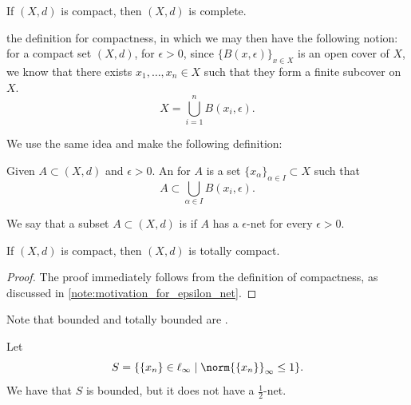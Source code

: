\documentclass[notoc,notitlepage]{tufte-book}
\begin{document}
\begin{crly}\label{crly:compact_metric_spaces_are_complete}
  If $(X, d)$ is compact, then $(X, d)$ is complete.
\end{crly}

\begin{note}\label{note:motivation_for_epsilon_net}
   the definition for compactness, in which we may then have the following notion: for a compact set $(X, d)$, for $\epsilon > 0$, since $\{ B(x, \epsilon ) \}_{x \in X}$ is an open cover of $X$, we know that there exists $x_1, \ldots, x_n \in X$ such that they form a finite subcover on $X$.
  \begin{equation*}
    X = \bigcup_{i=1}^{n} B(x_i, \epsilon).
  \end{equation*}
\end{note}

We use the same idea and make the following definition:

\begin{defn}\label{defn:_epsilon_net}
  Given $A \subset (X, d)$ and $\epsilon > 0$. An  for $A$ is a set $\{ x_\alpha \}_{\alpha \in I} \subset X$ such that
  \begin{equation*}
    A \subset \bigcup_{\alpha \in I} B(x_i, \epsilon).
  \end{equation*}
\end{defn}

\begin{defn}\label{defn:totally_bounded}
  We say that a subset $A \subset (X, d)$ is  if $A$ has a  $\epsilon$-net for every $\epsilon > 0$.
\end{defn}

\begin{thm}\label{thm:compact_sets_are_totally_bounded}
  If $(X, d)$ is compact, then $(X, d)$ is totally compact.
\end{thm}

\begin{proof}
  The proof immediately follows from the definition of compactness, as discussed in \cref{note:motivation_for_epsilon_net}.
\end{proof}

Note that bounded and totally bounded are .

\begin{eg}
  Let
  \begin{equation*}
    S = \{ \{ x_n \} \in \ell_\infty \mid \norm{ \{ x_n \} }_\infty \leq 1 \}.
  \end{equation*}
  We have that $S$ is bounded, but it does not have a $\frac{1}{2}$-net.
\end{eg}
\end{document}
